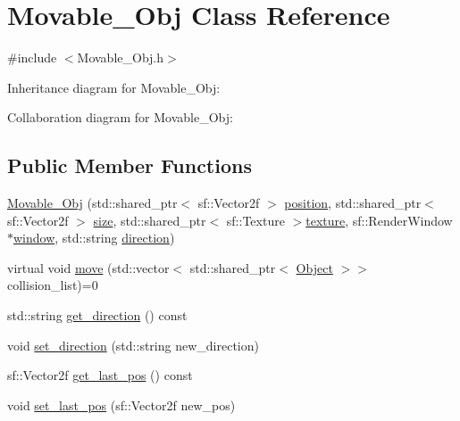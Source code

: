 \hypertarget{classMovable__Obj}{}\section{Movable\+\_\+\+Obj Class Reference}
\label{classMovable__Obj}


{\ttfamily \#include $<$Movable\+\_\+\+Obj.\+h$>$}



Inheritance diagram for Movable\+\_\+\+Obj\+:


Collaboration diagram for Movable\+\_\+\+Obj\+:
\subsection*{Public Member Functions}
\begin{DoxyCompactItemize}
\item 
\hyperlink{classMovable__Obj_a0d1217bd80e75ac8499642bf0edba15d}{Movable\+\_\+\+Obj} (std\+::shared\+\_\+ptr$<$ sf\+::\+Vector2f $>$ \hyperlink{classObject_a8b1724482fb412feb64a638038161b7a}{position}, std\+::shared\+\_\+ptr$<$ sf\+::\+Vector2f $>$ \hyperlink{classObject_ac8bfde5d0428d9c091854fe1a09b7d9f}{size}, std\+::shared\+\_\+ptr$<$ sf\+::\+Texture $>$\hyperlink{classObject_a8ff6491b841d0f48da3d98041fbca934}{texture}, sf\+::\+Render\+Window $\ast$\hyperlink{classObject_a5c6cfc086ea1e39e0b3cf8633a763bf8}{window}, std\+::string \hyperlink{classMovable__Obj_a4f4eb3171656831c1f0b8dbab2b2a00c}{direction})
\item 
virtual void \hyperlink{classMovable__Obj_a7bc9fbcd4dede97c2fae66c0502c8ead}{move} (std\+::vector$<$ std\+::shared\+\_\+ptr$<$ \hyperlink{classObject}{Object} $>$$>$ collision\+\_\+list)=0
\item 
std\+::string \hyperlink{classMovable__Obj_acb1cdd44fbc468eadd152e2a4da87771}{get\+\_\+direction} () const
\item 
void \hyperlink{classMovable__Obj_a06a8004daec88c5a8d9cc4a3fc1a3561}{set\+\_\+direction} (std\+::string new\+\_\+direction)
\item 
sf\+::\+Vector2f \hyperlink{classMovable__Obj_a33446d36817aa0c0e677b26486ea58fc}{get\+\_\+last\+\_\+pos} () const
\item 
void \hyperlink{classMovable__Obj_a4dc4a9c75291956d30705e3b29da7cfc}{set\+\_\+last\+\_\+pos} (sf\+::\+Vector2f new\+\_\+pos)
\end{DoxyCompactItemize}
